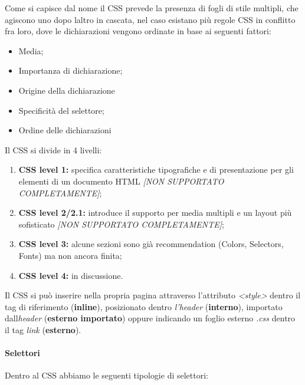 Come si capisce dal nome il CSS prevede la presenza di fogli di stile
multipli, che agiscono uno dopo l\textquotesingle altro in cascata, nel
caso esistano più regole CSS in conflitto fra loro, dove le
dichiarazioni vengono ordinate in base ai seguenti fattori:

\begin{itemize}
\item
  Media;
\item
  Importanza di dichiarazione;
\item
  Origine della dichiarazione
\item
  Specificità del selettore;
\item
  Ordine delle dichiarazioni
\end{itemize}

Il CSS si divide in 4 livelli:

\begin{enumerate}
\def\labelenumi{\arabic{enumi}.}
\item
  \textbf{CSS level 1:} specifica caratteristiche tipografiche e di
  presentazione per gli elementi di un documento HTML \emph{{[}NON
  SUPPORTATO COMPLETAMENTE{]}};
\item
  \textbf{CSS level 2/2.1:} introduce il supporto per media multipli e
  un layout più sofisticato \emph{{[}NON SUPPORTATO COMPLETAMENTE{]}};
\item
  \textbf{CSS level 3:} alcune sezioni sono già recommendation (Colors,
  Selectors, Fonts) ma non ancora finita;
\item
  \textbf{CSS level 4:} in discussione.
\end{enumerate}

Il CSS si può inserire nella propria pagina attraverso l'attributo
\emph{\textless style\textgreater{}} dentro il tag di riferimento
(\textbf{inline}), posizionato dentro \emph{l'header}
(\textbf{interno}), importato dall\textquotesingle{}\emph{header}
(\textbf{esterno importato}) oppure indicando un foglio esterno
\emph{.css} dentro il tag \emph{link} (\textbf{esterno}).

\paragraph{Selettori}\label{selettori}

Dentro al CSS abbiamo le seguenti tipologie di selettori:

